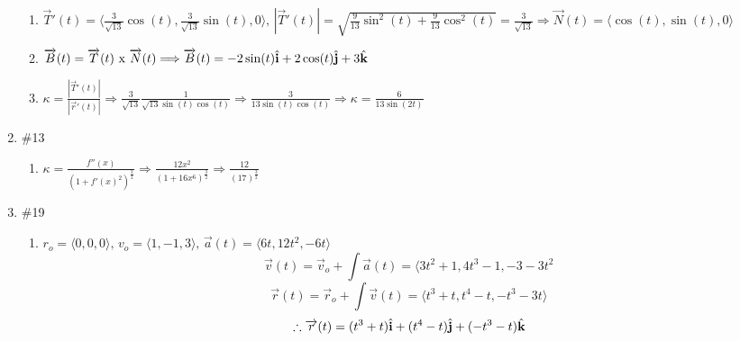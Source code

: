 \documentclass[12pt]{article}
\begin{document}
\begin{enumerate}
\begin{enumerate}
      \item $\overrightarrow{T}'(t) = \langle \frac{3}{\sqrt{13}}\cos(t), \frac{3}{\sqrt{13}}\sin(t), 0 \rangle\text{, } |\overrightarrow{T}'(t)| = \sqrt{\frac{9}{13}\sin^2(t)+\frac{9}{13}\cos^2(t)} = \frac{3}{\sqrt{13}} \Longrightarrow \overrightarrow{N}(t)= \langle \cos(t), \sin(t), 0 \rangle$

      \item $\overrightarrow{B}(t)=\overrightarrow{T}(t)\text{ x }\overrightarrow{N}(t)\Longrightarrow \overrightarrow{B}(t)= -2\sin(t)\hat{\bold{i}} + 2\cos(t)\hat{\bold{j}} + 3\hat{\bold{k}}$

      \item $\kappa = \frac{|\overrightarrow{T}'(t)|}{|\overrightarrow{r}'(t)|}\Rightarrow \frac{3}{\sqrt{13}}\frac{1}{\sqrt{13}\sin(t)\cos(t)}\Rightarrow \frac{3}{13\sin(t)\cos(t)}\Rightarrow \kappa = \frac{6}{13\sin(2t)} $

    \end{enumerate}

    \item \#13 \begin{enumerate}

        \item $\kappa = \frac{f''(x)}{(1+f'(x)^2)^\frac{3}{2}}\Longrightarrow \frac{12x^2}{(1+16x^6)^\frac{3}{2}}\Longrightarrow\frac{12}{(17)^\frac{3}{2}}$ 

      \end{enumerate}

    \item \#19 \begin{enumerate}

        \item $r_o = \langle 0, 0, 0 \rangle\text{, } v_o = \langle 1, -1, 3 \rangle\text{, } \overrightarrow{a}(t)= \langle 6t, 12t^2, -6t \rangle$\\
          $$\overrightarrow{v}(t)=\overrightarrow{v}_o + \int \overrightarrow{a}(t)= \langle 3t^2+1, 4t^3-1, -3-3t^2$$
          $$\overrightarrow{r}(t) = \overrightarrow{r}_o + \int \overrightarrow{v}(t)= \langle t^3+t, t^4-t, -t^3-3t \rangle$$
          $$\therefore \overrightarrow{r}(t) = (t^3+t)\hat{\bold{i}}+(t^4-t)\hat{\bold{j}}+(-t^3-t)\hat{\bold{k}}$$
      \end{enumerate}


\end{enumerate}
\end{document}
